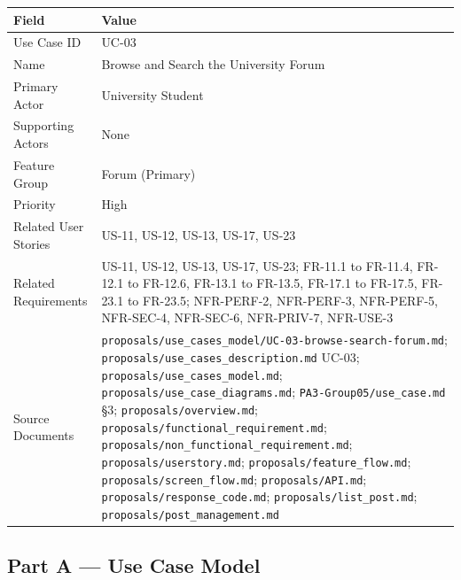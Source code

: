 \documentclass[12pt]{article}
\renewcommand{\baselinestretch}{1.5}
\begin{document}
\begingroup
\small
\renewcommand{\baselinestretch}{1.0}\selectfont
\renewcommand{\arraystretch}{1.15}
\setlength{\tabcolsep}{6pt}
\begin{longtable}{|>{\raggedright\arraybackslash}p{}|>{\raggedright\arraybackslash}p{}|}
\hline
\textbf{Field} & \textbf{Value} \\ \hline
\endhead
Use Case ID & UC-03 \\ \hline
Name & Browse and Search the University Forum \\ \hline
Primary Actor & University Student \\ \hline
Supporting Actors & None \\ \hline
Feature Group & Forum (Primary) \\ \hline
Priority & High \\ \hline
Related User Stories & US-11, US-12, US-13, US-17, US-23 \\ \hline
Related Requirements & US-11, US-12, US-13, US-17, US-23; FR-11.1 to FR-11.4, FR-12.1 to FR-12.6, FR-13.1 to FR-13.5, FR-17.1 to FR-17.5, FR-23.1 to FR-23.5; NFR-PERF-2, NFR-PERF-3, NFR-PERF-5, NFR-SEC-4, NFR-SEC-6, NFR-PRIV-7, NFR-USE-3 \\ \hline
Source Documents & \texttt{proposals/use\_cases\_model/UC-03-browse-search-forum.md}; \texttt{proposals/use\_cases\_description.md} UC-03; \texttt{proposals/use\_cases\_model.md}; \texttt{proposals/use\_case\_diagrams.md}; \texttt{PA3-Group05/use\_case.md} §3; \texttt{proposals/overview.md}; \texttt{proposals/functional\_requirement.md}; \texttt{proposals/non\_functional\_requirement.md}; \texttt{proposals/userstory.md}; \texttt{proposals/feature\_flow.md}; \texttt{proposals/screen\_flow.md}; \texttt{proposals/API.md}; \texttt{proposals/response\_code.md}; \texttt{proposals/list\_post.md}; \texttt{proposals/post\_management.md} \\ \hline
\end{longtable}
\endgroup
\par\medskip

\hypertarget{sec:part-a-use-case-model}{}
\subsection*{Part A --- Use Case Model}
\par\medskip

\hypertarget{sec:a1-focused-use-case-diagram}{}
\end{document}

